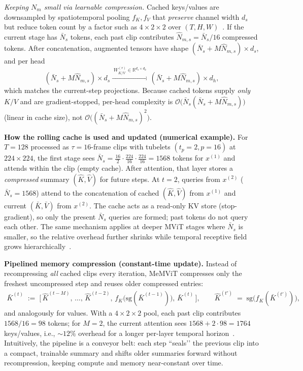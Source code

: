 \begin{enrichment}
\begin{enrichment}
        \emph{Keeping $N_m$ small via learnable compression.} Cached keys/values are downsampled by spatiotemporal pooling $f_K,f_V$ that \emph{preserve} channel width $d_s$ but reduce token count by a factor such as $4{\times}2{\times}2$ over $(T,H,W)$~\cite[Sec.~4.2]{wu2022_memvit}. If the current stage has $\bar N_s$ tokens, each past clip contributes $\hat N_{m,s}=\bar N_s/16$ compressed tokens. After concatenation, augmented tensors have shape $(\bar N_s{+}M\hat N_{m,s})\times d_s$, and per head
        \[
        (\bar N_s{+}M\hat N_{m,s})\times d_s \xrightarrow{\;W_{K/V}^{(r)}\in\mathbb{R}^{d_s\times d_h}\;} (\bar N_s{+}M\hat N_{m,s})\times d_h,
        \]
        which matches the current-step projections. Because cached tokens supply \emph{only} $K/V$ and are gradient-stopped, per-head complexity is $\mathcal{O}\!\big(\bar N_s(\bar N_s{+}M\hat N_{m,s})\big)$ (linear in cache size), not $\mathcal{O}\!\big((\bar N_s{+}M\hat N_{m,s})^2\big)$.
        
        \textbf{How the rolling cache is used and updated (numerical example).}
        For $T{=}128$ processed as $\tau{=}16$-frame clips with tubelets $(t_p{=}2,p{=}16)$ at $224{\times}224$, the first stage sees $\bar N_s=\tfrac{16}{2}\cdot\tfrac{224}{16}\cdot\tfrac{224}{16}=1568$ tokens for $x^{(1)}$ and attends within the clip (empty cache). After attention, that layer stores a \emph{compressed} summary $(\hat K,\hat V)$ for future steps. At $t{=}2$, queries from $x^{(2)}$ ($\bar N_s{=}1568$) attend to the concatenation of cached $(\hat K,\hat V)$ from $x^{(1)}$ and current $(\bar K,\bar V)$ from $x^{(2)}$. The cache acts as a read-only KV store (stop-gradient), so only the present $\bar N_s$ queries are formed; past tokens do not query each other. The same mechanism applies at deeper MViT stages where $\bar N_s$ is smaller, so the relative overhead further shrinks while temporal receptive field grows hierarchically~\cite[Sec.~4.1]{wu2022_memvit}.
        
        \textbf{Pipelined memory compression (constant-time update).}
        Instead of recompressing \emph{all} cached clips every iteration, MeMViT compresses only the freshest uncompressed step and reuses older compressed entries:
        \begin{align}
            \bar K^{(t)} \;:=\; \big[\, \hat K^{(t{-}M)},\,\ldots,\,\hat K^{(t{-}2)},\, f_K\!\big(\mathrm{sg}(\bar K^{(t{-}1)})\big),\, \bar K^{(t)} \,\big], 
            \qquad \hat K^{(t')} \;=\; \mathrm{sg}\!\big(f_K(\bar K^{(t')})\big), \label{eq:memvit_pipeline}
        \end{align}
        and analogously for values. With a $4{\times}2{\times}2$ pool, each past clip contributes $1568/16=98$ tokens; for $M{=}2$, the current attention sees $1568{+}2\!\cdot\!98=1764$ keys/values, i.e., $\sim\!12\%$ overhead for a longer per-layer temporal horizon~\cite[Fig.~4; Table~1(b)]{wu2022_memvit}. Intuitively, the pipeline is a conveyor belt: each step “seals’’ the previous clip into a compact, trainable summary and shifts older summaries forward without recompression, keeping compute and memory near-constant over time.
        

\end{enrichment}
\end{enrichment}
